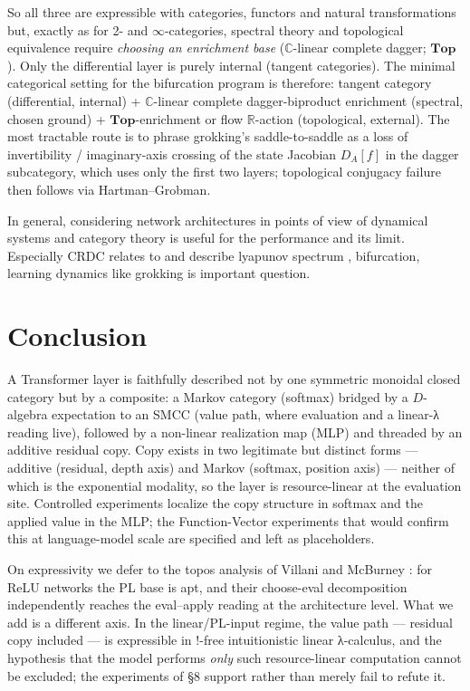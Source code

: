 \documentclass[a4paper,11pt]{article}
\begin{document}
So all three are expressible with categories, functors and natural
transformations but, exactly as for 2- and \(\infty\)-categories,
spectral theory and topological equivalence require \emph{choosing an
enrichment base} (\(\mathbb{C}\)-linear complete dagger;
\(\mathbf{Top}\)). Only the differential layer is purely internal
(tangent categories). The minimal categorical setting for the
bifurcation program is therefore: tangent category (differential,
internal) + \(\mathbb{C}\)-linear complete dagger-biproduct enrichment
(spectral, chosen ground) + \(\mathbf{Top}\)-enrichment or flow
\(\mathbb{R}\)-action (topological, external). The most tractable route
is to phrase grokking's saddle-to-saddle as a loss of invertibility /
imaginary-axis crossing of the state Jacobian \(D_A[f]\) in the dagger
subcategory, which uses only the first two layers; topological conjugacy
failure then follows via Hartman--Grobman.

In general, considering network architectures in points of view of
dynamical systems and category theory is useful for the performance and
its limit. Especially CRDC relates to and describe lyapunov spectrum ,
bifurcation, learning dynamics like grokking is important question.

\hypertarget{conclusion}{%
\section{Conclusion}\label{conclusion}}

A Transformer layer is faithfully described not by one symmetric
monoidal closed category but by a composite: a Markov category (softmax)
bridged by a \(D\)-algebra expectation to an SMCC (value path, where
evaluation and a linear-λ reading live), followed by a non-linear
realization map (MLP) and threaded by an additive residual copy. Copy
exists in two legitimate but distinct forms --- additive (residual,
depth axis) and Markov (softmax, position axis) --- neither of which is
the exponential modality, so the layer is resource-linear at the
evaluation site. Controlled experiments localize the copy structure in
softmax and the applied value in the MLP; the Function-Vector
experiments that would confirm this at language-model scale are
specified and left as placeholders.

On expressivity we defer to the topos analysis of Villani and McBurney \cite{Topos}: for ReLU networks the PL base is apt, and their choose-eval
decomposition independently reaches the eval--apply reading at the architecture level. What we add is a different axis. 
In the linear/PL-input regime, the value path --- residual copy included --- is expressible in \(!\)-free intuitionistic linear λ-calculus, and the hypothesis that the model performs \emph{only} such resource-linear computation cannot be excluded; the experiments of §8 support rather than merely fail to refute it.
\end{document}
